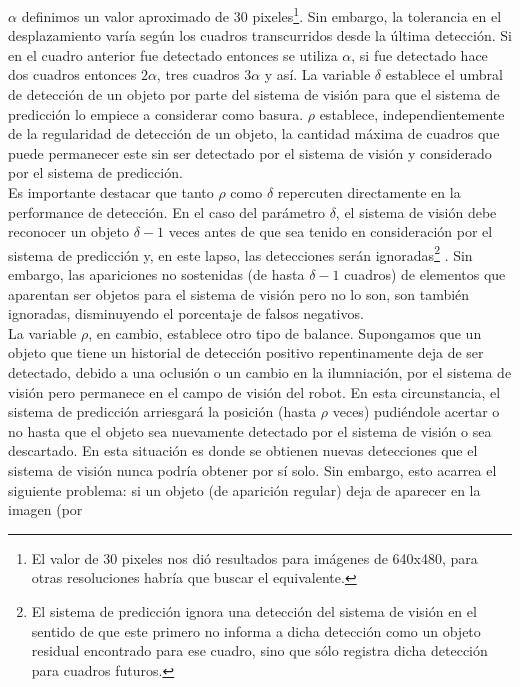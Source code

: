 $\alpha$ definimos un valor aproximado de 30 pixeles\footnote{ El 
valor de 30 pixeles nos di\'o resultados para im\'agenes de 640x480, para 
otras resoluciones habr\'ia que buscar el equivalente.}. Sin embargo, la 
tolerancia en el desplazamiento var\'ia seg\'un los cuadros transcurridos desde la \'ultima 
detecci\'on. Si en el cuadro anterior fue detectado entonces se utiliza 
$\alpha$, si fue detectado hace dos cuadros entonces $2\alpha$, tres 
cuadros $3\alpha$ y as\'i. La variable $\delta$ establece el umbral de 
detecci\'on de un objeto por parte del sistema de visi\'on para que el 
sistema de predicci\'on lo empiece  a considerar como basura. $\rho$ establece, 
independientemente de la  
regularidad de detecci\'on de un objeto, la cantidad m\'axima de cuadros que puede 
permanecer este sin ser detectado por el sistema de visi\'on y 
considerado por el sistema de predicci\'on. \\  	
\indent Es importante destacar que tanto $\rho$ como $\delta$ repercuten directamente en la 
performance de detecci\'on. En el caso del par\'ametro $\delta$, el 
sistema de visi\'on debe reconocer un objeto $\delta -1$ veces antes de que sea 
tenido en consideraci\'on por el sistema de predicci\'on y, en este lapso, las 
detecciones ser\'an ignoradas\footnote{El sistema de predicci\'on ignora 
una detecci\'on del sistema de visi\'on en el sentido de que este primero 
no informa a dicha detecci\'on como un objeto residual encontrado para 
ese cuadro, sino que s\'olo registra dicha detecci\'on para 
cuadros futuros.} . Sin embargo, las apariciones no sostenidas 
(de hasta $\delta -1$ cuadros) de elementos que aparentan ser objetos 
para el sistema de visi\'on pero no lo son, son tambi\'en ignoradas, 
disminuyendo el porcentaje de falsos negativos.\\
\indent La variable $\rho$, en cambio, establece otro tipo de balance. 
Supongamos que un objeto que tiene un historial de detecci\'on 
positivo repentinamente deja de ser detectado, debido a una oclusi\'on 
o un cambio en la ilumniaci\'on, por el sistema de visi\'on 
pero permanece en el campo de visi\'on del robot. En esta 
circunstancia, el sistema de predicci\'on 
arriesgar\'a la posici\'on (hasta $\rho$ veces) pudi\'endole acertar o no hasta que el objeto 
sea nuevamente detectado por el sistema de visi\'on o sea descartado.
En esta situaci\'on es donde se obtienen nuevas detecciones que el 
sistema de visi\'on nunca podr\'ia obtener por s\'i solo. Sin embargo, 
esto acarrea el siguiente problema: si un objeto (de aparici\'on regular) deja de aparecer en la imagen (por 
